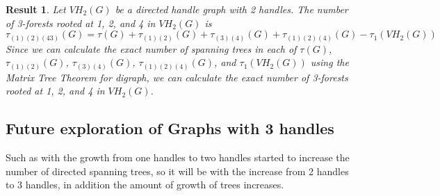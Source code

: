 \documentclass[twoside,11pt]{article}
\numberwithin{equation}{section} \DeclareMathOperator{\Var}{Var}
\newtheorem{result}{Result}
\begin{document}
\begin{result}
Let $VH_2(G)$ be a directed handle graph with 2 handles. The number of 3-forests rooted at 1, 2, and 4 in $VH_2(G)$ is \[
\tau_{(1)(2)(43)}(G) = \tau(G)+\tau_{(1)(2)}(G)+\tau_{(3)(4)}(G)+
 \tau_{(1)(2)(4)}(G)-\tau_1(VH_2(G))
\]
Since we can calculate the exact number of spanning trees in each of $\tau(G)$,  $\tau_{(1)(2)}(G)$, $\tau_{(3)(4)}(G)$, $\tau_{(1)(2)(4)}(G)$, and $\tau_1(VH_2(G))$ using the Matrix Tree Theorem for digraph, we can calculate the exact number of 3-forests rooted at 1, 2, and 4 in $VH_2(G)$.
\end{result}


\subsection{Future exploration of Graphs with 3 handles}

Such as with the growth from one handles to two handles started to increase the number of directed spanning trees, so it will be with the increase from 2 handles to 3 handles, in addition the amount of growth of trees increases.
\end{document}
